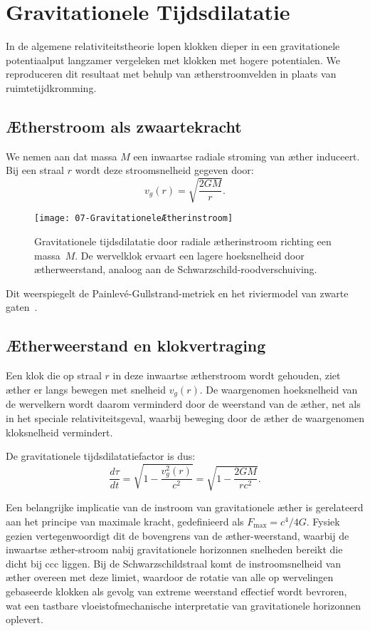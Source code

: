 \section{Gravitationele Tijdsdilatatie}

In de algemene relativiteitstheorie lopen klokken dieper in een gravitationele potentiaalput langzamer vergeleken met klokken met hogere potentialen. We reproduceren dit resultaat met behulp van ætherstroomvelden in plaats van ruimtetijdkromming.

\subsection*{Ætherstroom als zwaartekracht}

We nemen aan dat massa $M$ een inwaartse radiale stroming van æther induceert. Bij een straal $r$ wordt deze stroomsnelheid gegeven door:
\[
    v_g(r) = \sqrt{\frac{2GM}{r}}.
\]

\begin{figure}[htbp]
    \centering
    \texttt{[image: 07-GravitationeleÆtherinstroom]}
    \caption{Gravitationele tijdsdilatatie door radiale ætherinstroom richting een massa~$M$. De wervelklok ervaart een lagere hoeksnelheid door ætherweerstand, analoog aan de Schwarzschild-roodverschuiving.}
    \label{fig:GravitationeleÆtherinstroom}
\end{figure}

Dit weerspiegelt de Painlevé-Gullstrand-metriek en het riviermodel van zwarte gaten~\cite{Hamilton2004-river}.

\subsection*{Ætherweerstand en klokvertraging}

Een klok die op straal $r$ in deze inwaartse ætherstroom wordt gehouden, ziet æther er langs bewegen met snelheid $v_g(r)$. De waargenomen hoeksnelheid van de wervelkern wordt daarom verminderd door de weerstand van de æther, net als in het speciale relativiteitsgeval, waarbij beweging door de æther de waargenomen kloksnelheid vermindert.

De gravitationele tijdsdilatatiefactor is dus:
\[
    \frac{d\tau}{dt} = \sqrt{1 - \frac{v_g^2(r)}{c^2}} = \sqrt{1 - \frac{2GM}{rc^2}}. \tag{4}
\]

Een belangrijke implicatie van de instroom van gravitationele æther is gerelateerd aan het principe van maximale kracht, gedefinieerd als $F_\text{max} = c^4 /4G$. Fysiek gezien vertegenwoordigt dit de bovengrens van de æther-weerstand, waarbij de inwaartse æther-stroom nabij gravitationele horizonnen snelheden bereikt die dicht bij ccc liggen. Bij de Schwarzschildstraal komt de instroomsnelheid van æther overeen met deze limiet, waardoor de rotatie van alle op wervelingen gebaseerde klokken als gevolg van extreme weerstand effectief wordt bevroren, wat een tastbare vloeistofmechanische interpretatie van gravitationele horizonnen oplevert.

